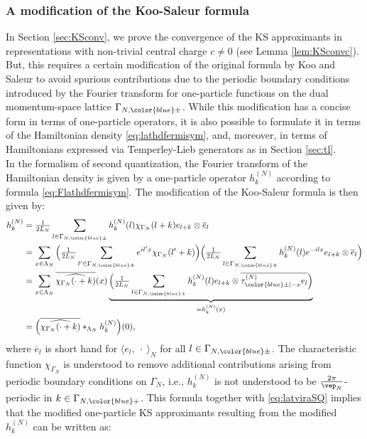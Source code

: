 \documentclass[a4paper, 11pt]{article}
\DeclareMathOperator{\1}{\mathds{1}}
\begin{document}
\subsubsection{A modification of the Koo-Saleur formula}
\label{sec:KSmod}
In Section \ref{sec:KSconv}, we prove the convergence of the KS approximants in representations with non-trivial central charge $c\neq0$ (see Lemma \ref{lem:KSconvc}). But, this requires a certain modification of the original formula by Koo and Saleur to avoid spurious contributions due to the periodic boundary conditions introduced by the Fourier transform for one-particle functions on the dual momentum-space lattice $\Gamma_{N,{\color{blue}\pm}}$. While this modification has a concise form in terms of one-particle operators, it is also possible to formulate it in terms of the Hamiltonian density \eqref{eq:lathdfermisym}, and, moreover, in terms of Hamiltonians expressed via Temperley-Lieb generators as in Section \ref{sec:tl}.\\
In the formalism of second quantization, the Fourier transform of the Hamiltonian density is given by a one-particle operator $h^{(N)}_{k}$ according to formula  \eqref{eq:Flathdfermisym}. The modification of the Koo-Saleur formula is then given by:
\begin{align}
\label{eq:hdmod1p}
h^{(N)}_{k} & = \tfrac{1}{2L_{N}}\sum_{l\in\Gamma_{N,{\color{blue}\pm}}}h^{(N)}_{k}(l)\chi_{\Gamma_{N}}(l+k)e_{l+k}\otimes \overline{e}_{l} \\ \nonumber
 & = \sum_{x\in\Lambda_{N}}\Big(\tfrac{1}{2L_{N}}\sum_{l'\in\Gamma_{N,{\color{blue}\pm}}}e^{il'x}\chi_{\Gamma_{N}}(l'+k)\Big)\Big(\tfrac{1}{2L_{N}}\sum_{l\in\Gamma_{N,{\color{blue}\pm}}}h^{(N)}_{k}(l)e^{-ilx}e_{l+k}\otimes \overline{e}_{l}\Big) \\ \nonumber
  & = \sum_{x\in\Lambda_{N}}\overline{\widehat{\chi_{\Gamma_{N}}(\cdot+k)}}(x)\underbrace{\Big(\tfrac{1}{2L_{N}}\sum_{l\in\Gamma_{N,{\color{blue}\pm}}}h^{(N)}_{k}(l)e_{l+k}\otimes \overline{\tau^{(N)}_{{\color{blue}\pm} |-x}e_{l}}\Big)}_{=h^{(N)}_{k}(x)} \\ \nonumber
  & = \Big(\overline{\widehat{\chi_{\Gamma_{N}}(\cdot+k)}}\ast_{\Lambda_{N}}h^{(N)}_{k}\Big)(0),
\end{align}
where $\overline{e}_{l}$ is short hand for $\langle e_{l},\!\ \cdot\!\ \rangle_{N}$ for all $l\in\Gamma_{N,{\color{blue}\pm}}$. The characteristic function $\chi_{\Gamma_{N}}$ is understood to remove additional contributions arising from periodic boundary conditions on $\Gamma_{N}$, i.e., $h^{(N)}_{k}$ is not understood to be $\tfrac{2\pi}{\vep_{N}}$-periodic in $k\in\Gamma_{N,{\color{blue}+}}$. This formula together with \eqref{eq:latviraSQ} implies that the modified one-particle KS approximants resulting from the modified $h^{(N)}_{k}$ can be written as:
\end{document}
